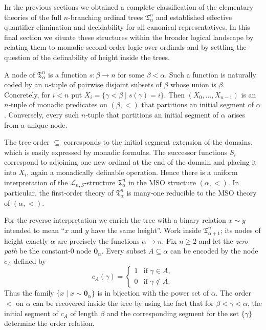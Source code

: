 \documentclass{amsart}
\theoremstyle{definition}
\begin{document}
In the previous sections we obtained a complete classification of the elementary theories of the full $n$-branching ordinal trees $\mathfrak{T}_\alpha^n$ and established effective quantifier elimination and decidability for all canonical representatives.  In this final section we situate these structures within the broader logical landscape by relating them to monadic second‑order logic over ordinals and by settling the question of the definability of height inside the trees.

A node of $\mathfrak{T}_\alpha^n$ is a function $s:\beta\to n$ for some $\beta<\alpha$.  Such a function is naturally coded by an $n$‑tuple of pairwise disjoint subsets of $\beta$ whose union is $\beta$. Concretely, for $i<n$ put $X_i = \{\gamma<\beta\mid s(\gamma)=i\}.$ Then $(X_0,\dots,X_{n-1})$ is an $n$‑tuple of monadic predicates on $(\beta,<)$ that partitions an initial segment of $\alpha$.  Conversely, every such $n$‑tuple that partitions an initial segment of $\alpha$ arises from a unique node.

The tree order $\subseteq$ corresponds to the initial segment extension of the domains, which is easily expressed by monadic formulas. The successor functions $S_i$ correspond to adjoining one new ordinal at the end of the domain and placing it into $X_i$, again a monadically definable operation.  Hence there is a uniform interpretation of the $\mathcal{L}_{n,S}$-structure $\mathfrak{T}_\alpha^n$ in the MSO structure $(\alpha,<)$. In particular, the first‑order theory of $\mathfrak{T}_\alpha^n$ is many‑one reducible to the MSO theory of $(\alpha,<)$.

For the reverse interpretation we enrich the tree with a binary relation $x\sim y$ intended to mean ``$x$ and $y$ have the same height''.  Work inside $\mathfrak{T}_{\alpha+1}^n$; its nodes of height exactly $\alpha$ are precisely the functions $\alpha\to n$.  Fix $n\ge 2$ and let the \emph{zero path} be the constant‑$0$ node $\mathbf{0}_\alpha$.  Every subset $A\subseteq\alpha$ can be encoded by the node $c_A$ defined by
\[
c_A(\gamma) = \begin{cases}
1 & \text{if }\gamma\in A,\\
0 & \text{if }\gamma\notin A .
\end{cases}
\]
Thus the family $\{x\mid x\sim\mathbf{0}_\alpha\}$ is in bijection with the power set of $\alpha$.  The order $<$ on $\alpha$ can be recovered inside the tree by using the fact that for $\beta<\gamma<\alpha$, the initial segment of $c_A$ of length $\beta$ and the corresponding segment for the set $\{\gamma\}$ determine the order relation.  
\end{document}
